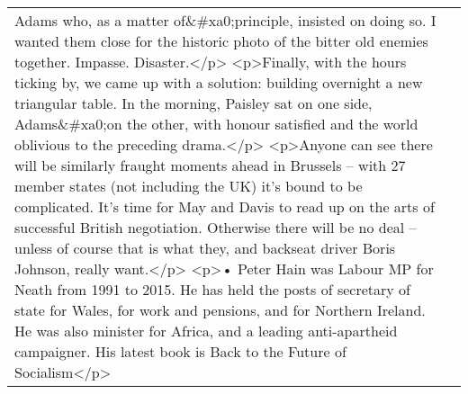 \documentclass[]{article}
\begin{document}
\begin{table}[!h]
{\begin{tabular}[t]{ll}
Adams who, as a matter of\&\#xa0;principle, insisted on doing so. I wanted them close for the historic photo of the bitter old enemies together. Impasse. Disaster.</p> <p>Finally, with the hours ticking by, we came up with a solution: building overnight a new triangular table. In the morning, Paisley sat on one side, Adams\&\#xa0;on the other, with honour satisfied and the world oblivious to the preceding drama.</p> <p>Anyone can see there will be similarly fraught moments ahead in Brussels – with 27 member states (not including the UK) it’s bound to be complicated. It’s time for May and Davis to read up on the arts of successful British negotiation. Otherwise there will be no deal – unless of course that is what they, and backseat driver Boris Johnson, really want.</p> <p>• Peter Hain was Labour MP for Neath from 1991 to 2015. He has held the posts of secretary of state for Wales, for work and pensions, and for Northern Ireland. He was also minister for Africa, and a leading anti-apartheid campaigner. His latest book is Back to the Future of Socialism</p>\\

\end{tabular}}
\end{table}
\end{document}
